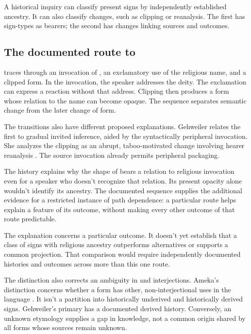 \documentclass[12pt]{article}
\begin{document}
A historical inquiry can classify present signs by independently established
ancestry. It can also classify changes, such as clipping or reanalysis.
The first has sign-types as bearers; the second has changes linking
sources and outcomes.

\subsection{The documented route to }

\textcite{gehweiler2008} traces  through an invocation of ,
an exclamatory use of the religious name, and a clipped form. In the invocation, the speaker addresses the deity.
The exclamation can express a reaction without that address. Clipping
then produces a form whose relation to the name can become opaque.
The sequence separates semantic change from the later change of form.

The transitions also have different proposed explanations. Gehweiler
relates the first to gradual invited inference, aided by the syntactically
peripheral invocation. She analyzes the clipping as an abrupt, taboo-motivated
change involving hearer reanalysis \citep[84--88]{gehweiler2008}. The
source invocation already permits peripheral packaging.

The history explains why the shape of  bears a relation
to religious invocation even for a speaker who doesn't recognize that
relation. Its present opacity alone wouldn't identify its ancestry.
The documented sequence supplies the additional evidence for a
restricted instance of path dependence: a particular route helps explain
a feature of its outcome, without making every other outcome of that
route predictable.

The explanation concerns a particular outcome. It doesn't yet establish
that a class of signs with religious ancestry outperforms alternatives
or supports a common projection. That comparison would require independently
documented histories and outcomes across more than this one route.

The distinction also corrects an ambiguity in  and
 interjections. Ameka's distinction concerns whether
a form has other, non-interjectional uses in the language
\citep[105--106]{ameka1992}. It isn't a partition into historically
underived and historically derived signs. Gehweiler's primary
 has a documented derived history. Conversely, an unknown
etymology supplies a gap in knowledge, not a common origin shared by
all forms whose sources remain unknown.
\end{document}
